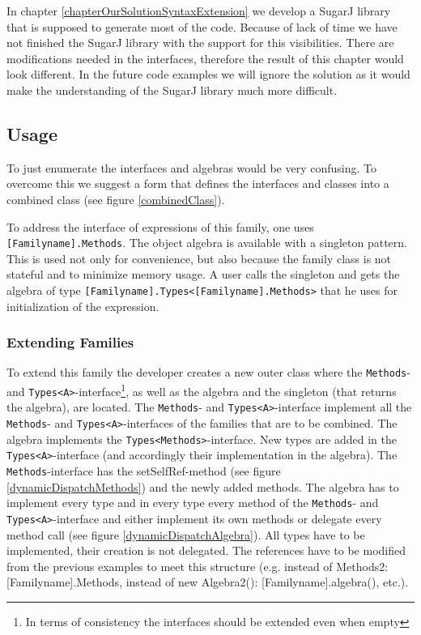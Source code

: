\documentclass{report}
\begin{document}
In chapter \ref{chapterOurSolutionSyntaxExtension} we develop a SugarJ library that is supposed to generate most of the code. Because of lack of time we have not finished the SugarJ library with the support for this visibilities. There are modifications needed in the interfaces, therefore the result of this chapter would look different. In the future code examples we will ignore the solution as it would make the understanding of the SugarJ library much more difficult.

\subsection{Usage}
\label{combiningTheParts}
To just enumerate the interfaces and algebras would be very confusing. To overcome this we suggest a form that defines the interfaces and classes into a combined class (see figure \ref{combinedClass}).

To address the interface of expressions of this family, one uses \lstinline{[Familyname].Methods}. The object algebra is available with a singleton pattern. This is used not only for convenience, but also because the family class is not stateful and to minimize memory usage. A user calls the singleton and gets the algebra of type \lstinline{[Familyname].Types<[Familyname].Methods>} that he uses for initialization of the expression.

\subsubsection*{Extending Families}
\label{extendingFamilies}

To extend this family the developer creates a new outer class where the \lstinline{Methods}- and \lstinline{Types<A>}-interface\footnote{In terms of consistency the interfaces should be extended even when empty}, as well as the algebra and the singleton (that returns the algebra), are located. The \lstinline{Methods}- and \lstinline{Types<A>}-interface implement all the \lstinline{Methods}- and \lstinline{Types<A>}-interfaces of the families that are to be combined. The algebra implements the \lstinline{Types<Methods>}-interface. New types are added in the \lstinline{Types<A>}-interface (and accordingly their implementation in the algebra). The \lstinline{Methods}-interface has the setSelfRef-method (see figure \ref{dynamicDispatchMethods}) and the newly added methods. The algebra has to implement every type and in every type every method of the \lstinline{Methods}- and \lstinline{Types<A>}-interface and either implement its own methods or delegate every method call (see figure \ref{dynamicDispatchAlgebra}). All types have to be implemented, their creation is not delegated. The references have to be modified from the previous examples to meet this structure (e.g. instead of Methods2: [Familyname].Methods, instead of new Algebra2(): [Familyname].algebra(), etc.).
\end{document}
